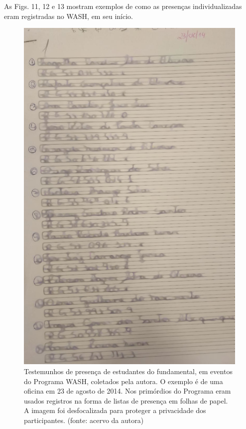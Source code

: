 As Figs. 11, 12 e 13 mostram exemplos de como as presenças individualizadas eram registradas no WASH, em seu início.



\captionsetup{format=plain}
\begin{figure}[htb]

\centering


\begin{minipage}[b]{0.4\linewidth}
        \centering
                \includegraphics[width=1.0\linewidth]{../../../imagens/blurred-Presenca-Oficina-2014-08-23.jpeg}
                \caption{Testemunhos de presença de estudantes do fundamental, em eventos do Programa WASH, coletados pela autora. O exemplo é de uma oficina em 23 de agosto de 2014. Nos primórdios do Programa eram usados registros na forma de listas de presença em folhas de papel. A imagem foi desfocalizada para proteger a privacidade dos participantes. (fonte: acervo da autora)}

\end{minipage}
\end{figure}
